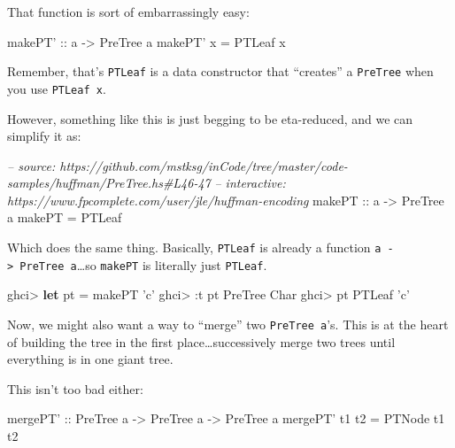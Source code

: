 \documentclass[]{article}
\newenvironment{Shaded}{}{}
\newcommand{\KeywordTok}[1]{\textcolor[rgb]{0.00,0.44,0.13}{\textbf{{#1}}}}
\newcommand{\DataTypeTok}[1]{\textcolor[rgb]{0.56,0.13,0.00}{{#1}}}
\newcommand{\CharTok}[1]{\textcolor[rgb]{0.25,0.44,0.63}{{#1}}}
\newcommand{\CommentTok}[1]{\textcolor[rgb]{0.38,0.63,0.69}{\textit{{#1}}}}
\newcommand{\OtherTok}[1]{\textcolor[rgb]{0.00,0.44,0.13}{{#1}}}
\newcommand{\FunctionTok}[1]{\textcolor[rgb]{0.02,0.16,0.49}{{#1}}}
\newcommand{\NormalTok}[1]{{#1}}
\begin{document}
That function is sort of embarrassingly easy:

\begin{Shaded}
\begin{Highlighting}[]
\OtherTok{makePT' ::} \NormalTok{a }\OtherTok{->} \DataTypeTok{PreTree} \NormalTok{a}
\NormalTok{makePT' x }\FunctionTok{=} \DataTypeTok{PTLeaf} \NormalTok{x}
\end{Highlighting}
\end{Shaded}

Remember, that's \texttt{PTLeaf} is a data constructor that ``creates'' a
\texttt{PreTree} when you use \texttt{PTLeaf\ x}.

However, something like this is just begging to be eta-reduced, and we can
simplify it as:

\begin{Shaded}
\begin{Highlighting}[]
\CommentTok{-- source: https://github.com/mstksg/inCode/tree/master/code-samples/huffman/PreTree.hs#L46-47}
\CommentTok{-- interactive: https://www.fpcomplete.com/user/jle/huffman-encoding}
\OtherTok{makePT ::} \NormalTok{a }\OtherTok{->} \DataTypeTok{PreTree} \NormalTok{a}
\NormalTok{makePT }\FunctionTok{=} \DataTypeTok{PTLeaf}
\end{Highlighting}
\end{Shaded}

Which does the same thing. Basically, \texttt{PTLeaf} is already a function
\texttt{a\ -\textgreater{}\ PreTree\ a}\ldots{}so \texttt{makePT} is literally
just \texttt{PTLeaf}.

\begin{Shaded}
\begin{Highlighting}[]
\NormalTok{ghci}\FunctionTok{>} \KeywordTok{let} \NormalTok{pt }\FunctionTok{=} \NormalTok{makePT }\CharTok{'c'}
\NormalTok{ghci}\FunctionTok{>} \FunctionTok{:}\NormalTok{t pt}
\DataTypeTok{PreTree} \DataTypeTok{Char}
\NormalTok{ghci}\FunctionTok{>} \NormalTok{pt}
\DataTypeTok{PTLeaf} \CharTok{'c'}
\end{Highlighting}
\end{Shaded}

Now, we might also want a way to ``merge'' two \texttt{PreTree\ a}'s. This is at
the heart of building the tree in the first place\ldots{}successively merge two
trees until everything is in one giant tree.

This isn't too bad either:

\begin{Shaded}
\begin{Highlighting}[]
\OtherTok{mergePT' ::} \DataTypeTok{PreTree} \NormalTok{a }\OtherTok{->} \DataTypeTok{PreTree} \NormalTok{a }\OtherTok{->} \DataTypeTok{PreTree} \NormalTok{a}
\NormalTok{mergePT' t1 t2 }\FunctionTok{=} \DataTypeTok{PTNode} \NormalTok{t1 t2}
\end{Highlighting}
\end{Shaded}
\end{document}
